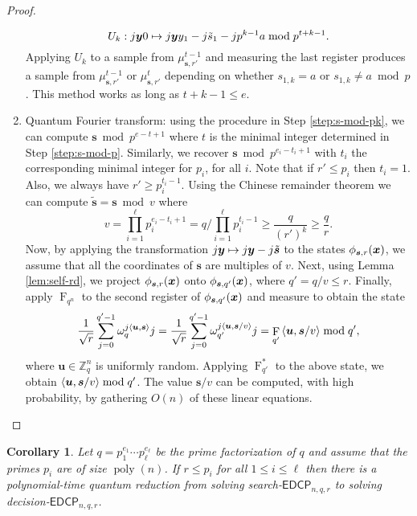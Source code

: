 \documentclass[11pt]{article}
\theoremstyle{plain}
\newtheorem{corollary}[theorem]{Corollary}
\theoremstyle{definition}
\DeclareMathOperator{\poly}{poly}
\DeclareMathOperator{\qft}{F}
\let\ket\relax
\DeclarePairedDelimiter{\ket}{\lvert}{\rangle}
\DeclarePairedDelimiter{\lrang}{\langle}{\rangle}
\def\Z{\mathbb{Z}}
\def\edcp{\mathsf{EDCP}}
\begin{document}
\begin{proof}
\begin{enumerate}[leftmargin = *, font = \bfseries]
    \begin{equation*}
        U_k: \ket{j}\ket{\bm{y}}\ket{0} \mapsto \ket{j}\ket{\bm{y}}\ket{y_1 - j\tilde{s}_1 - jp^{k - 1}a \bmod p^{t + k - 1}}.
    \end{equation*}
    Applying $U_k$ to a sample from $\mu_{\bm{s}, r'}^{t - 1}$ and measuring the last register produces a sample from $\mu_{\bm{s}, r'}^{t - 1}$ or $\mu_{\bm{s}, r'}^t$ depending on whether $s_{1, k} = a$ or $s_{1, k} \ne a \bmod p$. This method works as long as $t + k - 1 \le e$.
    \item Quantum Fourier transform: using the procedure in Step \ref{step:s-mod-pk}, we can compute $\bm{s} \bmod p^{e - t + 1}$ where $t$ is  the minimal integer determined in Step \ref{step:s-mod-p}. Similarly, we recover $\bm{s} \bmod p^{e_i - t_i + 1}$ with $t_i$ the corresponding minimal integer for $p_i$, for all $i$. Note that if $r' \le p_i$ then $t_i = 1$. Also, we always have $r' \ge p_i^{t_i - 1}$. Using the Chinese remainder theorem we can compute $\tilde{\bm{s}} = \bm{s} \bmod v$ where
    \[ v = \prod_{i = 1}^\ell p_i^{e_i - t_i + 1} = q / \prod_{i = 1}^\ell p_i^{t_i - 1} \ge \frac{q}{(r')^k} \ge \frac{q}{r}. \]
    Now, by applying the transformation $\ket{j}\ket{\bm{y}} \mapsto \ket{j}\ket{\bm{y} - j\tilde{\bm{s}}}$ to the states $\ket{\phi_{\bm{s}, r}(\bm{x})}$, we assume that all the coordinates of $\bm{s}$ are multiples of $v$. Next, using Lemma \ref{lem:self-rd}, we project $\ket{\phi_{\bm{s}, r}(\bm{x})}$ onto $\ket{\phi_{\bm{s}, q'}(\bm{x})}$, where $q' = q / v \le r$. Finally, apply $\qft_{q^n}$ to the second register of $\ket{\phi_{\bm{s}, q'}(\bm{x})}$ and measure to obtain the state
    \[ \frac{1}{\sqrt{r}} \sum_{j = 0}^{q' - 1} \omega_q^{j\lrang{\bm{u}, \bm{s}}} \ket{j} = \frac{1}{\sqrt{r}} \sum_{j = 0}^{q' - 1} \omega_{q'}^{j\lrang{\bm{u}, \bm{s} / v}} \ket{j} = \qft_{q'}\ket{\lrang{\bm{u}, \bm{s} / v} \bmod q'}, \]
    where $\bm{u} \in \Z_q^n$ is uniformly random. Applying $\qft_{q'}^*$ to the above state, we obtain $\lrang{\bm{u}, \bm{s} / v} \bmod q'$. The value $\bm{s} / v$ can be computed, with high probability, by gathering $O(n)$ of these linear equations. \qedhere
    \end{enumerate}
\end{proof}

\begin{corollary}
    Let $q = p_1^{e_1} \cdots p_\ell^{e_\ell}$ be the prime factorization of $q$ and assume that the primes $p_i$ are of size $\poly(n)$. If $r \le p_i$ for all $1 \le i \le \ell$ then there is a polynomial-time quantum reduction from solving search-$\edcp_{n, q, r}$ to solving decision-$\edcp_{n, q, r}$. 
\end{corollary}
\end{document}
